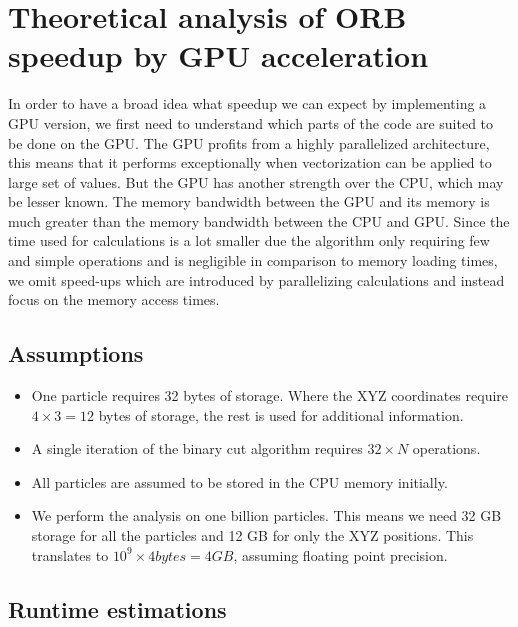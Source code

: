 \documentclass[]{article}
\begin{document}
\vspace{5mm}


\section{Theoretical analysis of ORB speedup by GPU acceleration}

In order to have a broad idea what speedup we can expect by implementing a GPU version, we first need to understand which parts of the code are suited to be done on the GPU. The GPU profits from a highly parallelized architecture, this means that it performs exceptionally when vectorization can be applied to large set of values. But the GPU has another strength over the CPU, which may be lesser known. The memory bandwidth between the GPU and its memory is much greater than the memory bandwidth between the CPU and GPU. Since the time used for calculations is a lot smaller due the algorithm only requiring few and simple operations and is negligible in comparison to memory loading times, we omit speed-ups which are introduced by parallelizing calculations and instead focus on the memory access times.

\subsection{Assumptions} 
\begin{itemize}
	\item 
	One particle requires 32 bytes of storage. Where the XYZ coordinates require $4\times3 = 12$ bytes of storage, the rest is used for additional information.
	
	\item
	A single iteration of the binary cut algorithm requires $32 \times N$ operations.
	
	\item 
	All particles are assumed to be stored in the CPU memory initially.
	
	\item
	We perform the analysis on one billion particles. This means we need 32 GB storage for all the particles and 12 GB for only the XYZ positions. This translates to $10^9 \times 4 bytes = 4 GB$, assuming floating point precision. 

\end{itemize}

\subsection{Runtime estimations}
\end{document}
